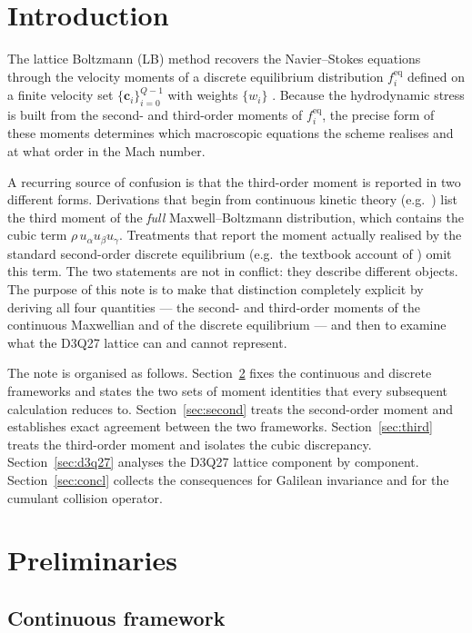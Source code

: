 \documentclass[preprint,11pt]{elsarticle}
\newcommand{\eq}{\mathrm{eq}}
\begin{document}
\section{Introduction}
\label{sec:intro}

The lattice Boltzmann (LB) method recovers the Navier--Stokes equations
through the velocity moments of a discrete equilibrium distribution
$f_i^{\eq}$ defined on a finite velocity set $\{\mathbf{c}_i\}_{i=0}^{Q-1}$
with weights $\{w_i\}$ \citep{Qian1992,HeLuo1997,Kruger2017}. Because the
hydrodynamic stress is built from the second- and third-order moments of
$f_i^{\eq}$, the precise form of these moments determines which macroscopic
equations the scheme realises and at what order in the Mach number.

A recurring source of confusion is that the third-order moment is reported in
two different forms. Derivations that begin from continuous kinetic theory
(e.g.\ \citealp{HeLuo1997,ShanYuanChen2006}) list the third moment of the
\emph{full} Maxwell--Boltzmann distribution, which contains the cubic term
$\rho\,u_\alpha u_\beta u_\gamma$. Treatments that report the moment actually
realised by the standard second-order discrete equilibrium (e.g.\ the
textbook account of \citealp{Kruger2017}) omit this term. The two statements
are not in conflict: they describe different objects. The purpose of this
note is to make that distinction completely explicit by deriving all four
quantities --- the second- and third-order moments of the continuous
Maxwellian and of the discrete equilibrium --- and then to examine what the
D3Q27 lattice can and cannot represent.

The note is organised as follows. Section~\ref{sec:prelim} fixes the
continuous and discrete frameworks and states the two sets of moment
identities that every subsequent calculation reduces to.
Section~\ref{sec:second} treats the second-order moment and establishes exact
agreement between the two frameworks. Section~\ref{sec:third} treats the
third-order moment and isolates the cubic discrepancy.
Section~\ref{sec:d3q27} analyses the D3Q27 lattice component by component.
Section~\ref{sec:concl} collects the consequences for Galilean invariance and
for the cumulant collision operator.

\section{Preliminaries}
\label{sec:prelim}

\subsection{Continuous framework}
\end{document}
